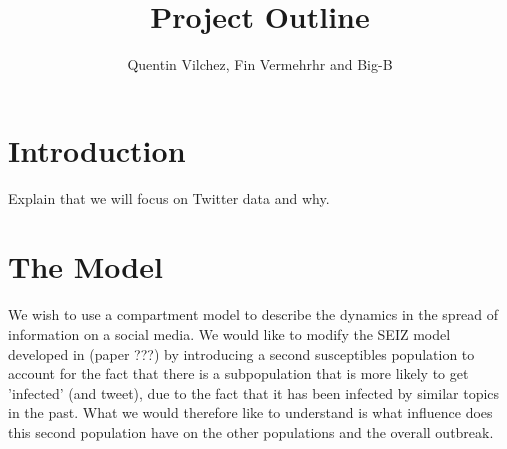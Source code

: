 \documentclass{article}
\author{Quentin Vilchez, Fin Vermehrhr and Big-B}
\title{Project Outline}
\begin{document}
\maketitle



\usetikzlibrary{arrows,automata}
\section{Introduction}
Explain that we will focus on Twitter data and why.

\section{The Model}
We wish to use a compartment model to describe the dynamics in the spread of information on a social media. We would like to modify the SEIZ model developed in (paper ???) by introducing a second susceptibles population to account for the fact that there is a subpopulation that is more likely to get 'infected' (and tweet), due to the fact that it has been infected by similar topics in the past. What we would therefore like to understand is what influence does this second population have on the other populations and the overall outbreak.
\end{document}
